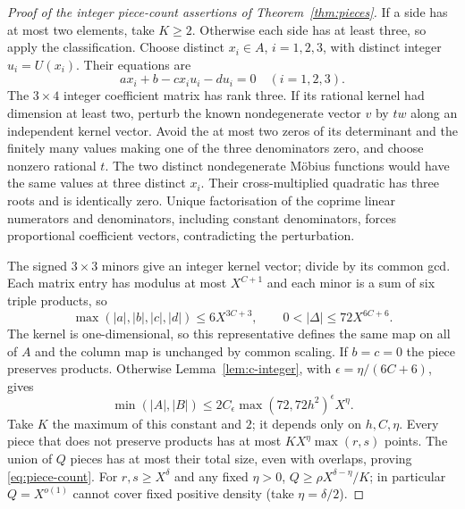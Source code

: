 \documentclass[11pt]{article}
\theoremstyle{definition}
\theoremstyle{remark}
\numberwithin{equation}{section}
\begin{document}
\begin{proof}[Proof of the integer piece-count assertions of Theorem~\ref{thm:pieces}]
If a side has at most two elements, take $K\ge2$. Otherwise each side has at least three, so apply the
classification. Choose distinct $x_i\in A$, $i=1,2,3$, with distinct integer $u_i=U(x_i)$.
Their equations are
\begin{equation}\label{eq:c-reconstruction}
 ax_i+b-cx_iu_i-du_i=0\quad(i=1,2,3).
\end{equation}
The $3\times4$ integer coefficient matrix has rank three. If its rational kernel had dimension at least
two, perturb the known nondegenerate vector $v$ by $tw$ along an independent kernel vector.
Avoid the at most two zeros of its determinant and the finitely many values making one of the three
denominators zero, and choose nonzero rational $t$.
The two distinct nondegenerate M\"obius functions would have the same values at three distinct $x_i$.
Their cross-multiplied quadratic has three roots and is identically zero. Unique factorisation of the
coprime linear numerators and denominators, including constant denominators, forces proportional
coefficient vectors, contradicting the perturbation.

The signed $3\times3$ minors give an integer kernel vector; divide by its common gcd.
Each matrix entry has modulus at most $X^{C+1}$ and each minor is a sum of six triple products, so
\begin{equation}\label{eq:c-height}
 \max(|a|,|b|,|c|,|d|)\le6X^{3C+3},\qquad0<|\Delta|\le72X^{6C+6}.
\end{equation}
The kernel is one-dimensional, so this representative defines the same map on all of $A$ and the
column map is unchanged by common scaling. If $b=c=0$ the piece preserves products.
Otherwise Lemma~\ref{lem:c-integer}, with $\epsilon=\eta/(6C+6)$, gives
\begin{equation}\label{eq:c-small-side}
 \min(|A|,|B|)\le2C_\epsilon\max(72,72h^2)^\epsilon X^\eta.
\end{equation}
Take $K$ the maximum of this constant and $2$; it depends only on $h,C,\eta$.
Every piece that does not preserve products has at most $KX^\eta\max(r,s)$ points.
The union of $Q$ pieces has at most their total size, even with overlaps, proving \eqref{eq:piece-count}.
For $r,s\ge X^\delta$ and any fixed $\eta>0$, $Q\ge\rho X^{\delta-\eta}/K$;
in particular $Q=X^{o(1)}$ cannot cover fixed positive density (take $\eta=\delta/2$).


\end{proof}
\end{document}
